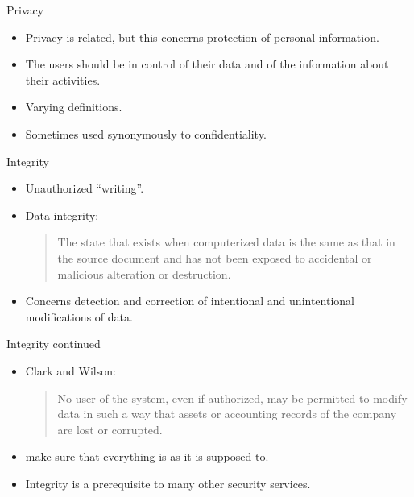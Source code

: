 \begin{frame}
  \begin{block}{Privacy}
    \begin{itemize}
      \item Privacy is related, but this concerns protection of personal 
        information.

      \item The users should be in control of their data and of the information 
        about their activities.

      \item Varying definitions.

      \item Sometimes used synonymously to confidentiality.
    \end{itemize}
  \end{block}
\end{frame}

\begin{frame}
  \begin{block}{Integrity}
    \begin{itemize}
      \item Unauthorized \enquote{writing}.

      \item Data integrity: \blockquote{The state that exists when computerized 
          data is the same as that in the source document and has not been exposed 
          to accidental or malicious alteration or destruction.}

      \item Concerns detection and correction of intentional and unintentional 
        modifications of data.
    \end{itemize}
  \end{block}
\end{frame}

\begin{frame}
  \begin{block}{Integrity continued}
    \begin{itemize}
      \item Clark and Wilson:
        \blockquote{No user of the system, even if authorized, may be permitted to 
          modify data in such a way that assets or accounting records of the 
          company are lost or corrupted.}

      \item \Ie make sure that everything is as it is supposed to.

      \item Integrity is a prerequisite to many other security services.
    \end{itemize}
  \end{block}
\end{frame}

